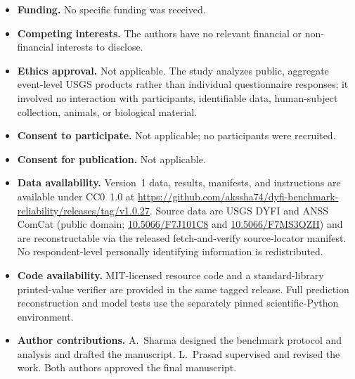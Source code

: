 \documentclass[pdflatex,sn-basic,iicol]{sn-jnl}
\begin{document}
\begin{itemize}\setlength{\itemsep}{2pt}\setlength{\parskip}{0pt}\setlength{\parsep}{0pt}
\item \textbf{Funding.} No specific funding was received.
\item \textbf{Competing interests.} The authors have no relevant financial or
non-financial interests to disclose.
\item \textbf{Ethics approval.} Not applicable. The study analyzes public,
aggregate event-level USGS products rather than individual questionnaire
responses; it involved no interaction with participants, identifiable data,
human-subject collection, animals, or biological material.
\item \textbf{Consent to participate.} Not applicable; no participants were
recruited.
\item \textbf{Consent for publication.} Not applicable.
\item \textbf{Data availability.} Version~1 data, results, manifests, and
instructions are available under CC0~1.0 at
\url{https://github.com/akssha74/dyfi-benchmark-reliability/releases/tag/v1.0.27}.
Source data are USGS DYFI and ANSS ComCat (public domain;
\href{https://doi.org/10.5066/F7J101C8}{10.5066/F7J101C8} and
\href{https://doi.org/10.5066/F7MS3QZH}{10.5066/F7MS3QZH}) and are reconstructable
via the released fetch-and-verify source-locator manifest. No respondent-level
personally identifying information is redistributed.
\item \textbf{Code availability.} MIT-licensed resource code and a
standard-library printed-value verifier are provided in the same tagged release.
Full prediction reconstruction and model tests use the separately pinned
scientific-Python environment.
\item \textbf{Author contributions.} A.~Sharma designed the benchmark protocol
and analysis and drafted the manuscript. L.~Prasad supervised and revised the
work. Both authors approved the final manuscript.
\end{itemize}


\end{document}
